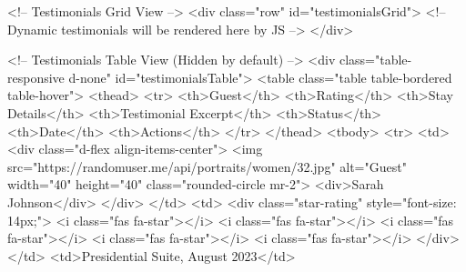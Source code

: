                                 <!-- Testimonials Grid View -->
                                <div class="row" id="testimonialsGrid">
                                    <!-- Dynamic testimonials will be rendered here by JS -->
                                </div>

                                <!-- Testimonials Table View (Hidden by default) -->
                                <div class="table-responsive d-none" id="testimonialsTable">
                                    <table class="table table-bordered table-hover">
                                        <thead>
                                            <tr>
                                                <th>Guest</th>
                                                <th>Rating</th>
                                                <th>Stay Details</th>
                                                <th>Testimonial Excerpt</th>
                                                <th>Status</th>
                                                <th>Date</th>
                                                <th>Actions</th>
                                            </tr>
                                        </thead>
                                        <tbody>
                                            <tr>
                                                <td>
                                                    <div class="d-flex align-items-center">
                                                        <img src="https://randomuser.me/api/portraits/women/32.jpg" alt="Guest" width="40" height="40" class="rounded-circle mr-2">
                                                        <div>Sarah Johnson</div>
                                                    </div>
                                                </td>
                                                <td>
                                                    <div class="star-rating" style="font-size: 14px;">
                                                        <i class="fas fa-star"></i>
                                                        <i class="fas fa-star"></i>
                                                        <i class="fas fa-star"></i>
                                                        <i class="fas fa-star"></i>
                                                        <i class="fas fa-star"></i>
                                                    </div>
                                                </td>
                                                <td>Presidential Suite, August 2023</td>
